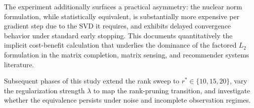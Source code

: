 The experiment additionally surfaces a practical asymmetry: the nuclear norm formulation, while statistically equivalent, is substantially more expensive per gradient step due to the SVD it requires, and exhibits delayed convergence behavior under standard early stopping. This documents quantitatively the implicit cost-benefit calculation that underlies the dominance of the factored $L_2$ formulation in the matrix completion, matrix sensing, and recommender systems literature.

Subsequent phases of this study extend the rank sweep to $r^* \in \{10, 15, 20\}$, vary the regularization strength $\lambda$ to map the rank-pruning transition, and investigate whether the equivalence persists under noise and incomplete observation regimes.
